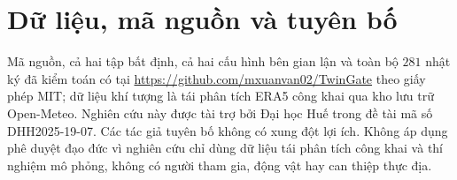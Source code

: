 \section*{Dữ liệu, mã nguồn và tuyên bố}

Mã nguồn, cả hai tập bất định, cả hai cấu hình bên gian lận và toàn bộ $281$ nhật ký
đã kiểm toán có tại \url{https://github.com/mxuanvan02/TwinGate} theo giấy phép MIT; dữ liệu khí tượng là tái phân tích ERA5 công khai qua kho lưu trữ
Open-Meteo. Nghiên cứu này được tài trợ bởi Đại học Huế trong đề tài mã số
DHH2025-19-07. Các tác giả tuyên bố không có xung đột lợi ích. Không áp dụng phê duyệt đạo đức vì nghiên cứu chỉ dùng dữ liệu tái phân tích công khai và thí
nghiệm mô phỏng, không có người tham gia, động vật hay can thiệp thực địa.

\clearpage
\appendix
\setcounter{table}{0}
\renewcommand{\thetable}{S\arabic{table}}






